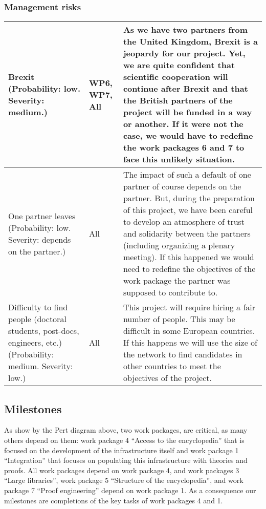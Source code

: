 \subsubsection*{Management risks}

\begin{longtable}{|p{}|p{}|p{}|}
\hline
Brexit (Probability: low. Severity: medium.)
&
WP6, WP7, All
&
As we have two partners from the United Kingdom, Brexit is a jeopardy
for our project. Yet, we are quite confident that scientific
cooperation will continue after Brexit and that the British partners
of the project will be funded in a way or another. If it were not the
case, we would have to redefine the work packages 6 and 7 to face
this unlikely situation.
\\
\hline
One partner leaves (Probability: low. Severity: depends on the partner.)
&
All
&
The impact of such a default of one partner of course depends on the
partner. But, during the preparation of this project, we have been
careful to develop an atmosphere of trust and solidarity between the
partners (including organizing a plenary meeting). If this happened
we would need to redefine the objectives of the work package the partner
was supposed to contribute to.
\\
\hline
Difficulty to find people (doctoral students, post-docs, engineers, etc.)
(Probability: medium. Severity: low.)
&
All
&
This project will require hiring a fair number of people. This may be
difficult in some European countries. If this happens we will use the
size of the network to find candidates in other countries to meet
the objectives of the project.\\
\hline
\end{longtable}

\subsection{Milestones}\label{sec:milestones}

As show by the Pert diagram above, two work packages, are critical, as
many others depend on them: work package 4 ``Access to the
encyclopedia'' that is focused on the development of the
infrastructure itself and work package 1 ``Integration'' that focuses
on populating this infrastructure with theories and proofs. All work
packages depend on work package 4, and work packages 3 ``Large
libraries'', work package 5 ``Structure of the encyclopedia'', and
work package 7 ``Proof engineering'' depend on work package 1.
As a consequence our milestones are completions of the key tasks of
work packages 4 and 1.


